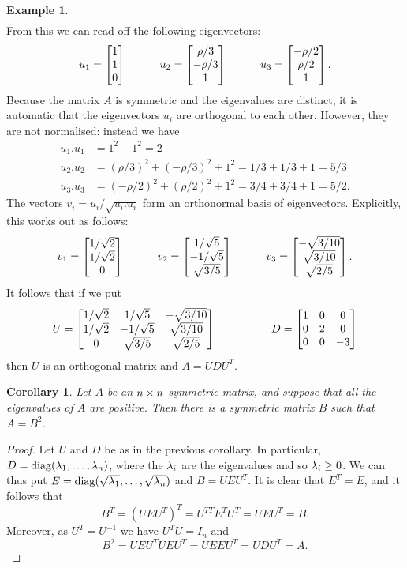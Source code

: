 \documentclass[reqno]{amsart}
\newtheorem{corollary}[theorem]{Corollary}
\theoremstyle{definition}
\newtheorem{example}[theorem]{Example}
\begin{document}
\begin{example}
\begin{align*}
 \end{align*}
 From this we can read off the following eigenvectors:
 \[
    u_1 = \left[\begin{matrix} 1\\1\\0\end{matrix}\right] \hspace{3em}
    u_2 = \left[\begin{matrix} \rho/3 \\ -\rho/3\\ 1\end{matrix}\right] \hspace{3em}
    u_3 = \left[\begin{matrix} -\rho/2\\ \rho/2 \\ 1 \end{matrix}\right]. 
 \]
 Because the matrix $A$ is symmetric and the eigenvalues are distinct,
 it is automatic that the eigenvectors $u_i$ are orthogonal to each
 other.  However, they are not normalised: instead we have
 \begin{align*}
    u_1.u_1 &= 1^2+1^2 = 2 \\
    u_2.u_2 &= (\rho/3)^2 + (-\rho/3)^2 + 1^2 
             = 1/3 + 1/3 + 1 = 5/3 \\
    u_3.u_3 &= (-\rho/2)^2 + (\rho/2)^2 + 1^2
             = 3/4 + 3/4 + 1 = 5/2.
 \end{align*}
 The vectors $v_i=u_i/\sqrt{u_i.u_i}$ form an orthonormal basis of
 eigenvectors.  Explicitly, this works out as follows:
 \[ 
   v_1 = \left[\begin{matrix} 1/\sqrt{2} \\ 1/\sqrt{2} \\ 0 \end{matrix}\right]
   \hspace{3em}
   v_2 = \left[\begin{matrix} 1/\sqrt{5} \\ -1/\sqrt{5} \\ \sqrt{3/5} \end{matrix}\right]
   \hspace{3em}
   v_3 = \left[\begin{matrix} -\sqrt{3/10} \\ \sqrt{3/10} \\ \sqrt{2/5} \end{matrix}\right].
 \]
 It follows that if we put 
 \[ 
  U = \left[\begin{matrix} 
       1/\sqrt{2} &  1/\sqrt{5} & -\sqrt{3/10} \\
       1/\sqrt{2} & -1/\sqrt{5} &  \sqrt{3/10} \\
       0          &  \sqrt{3/5} &  \sqrt{2/5} 
      \end{matrix}\right]
  \hspace{5em}
  D = \left[\begin{matrix} 
       1 & 0 & 0 \\ 0 & 2 & 0 \\ 0 & 0 & -3 
      \end{matrix}\right]
 \]
 then $U$ is an orthogonal matrix and $A=UDU^T$.
\end{example}

\begin{corollary}\label{cor-square-root}
 Let $A$ be an $n\times n$ symmetric matrix, and suppose that all the
 eigenvalues of $A$ are positive.  Then there is a symmetric matrix
 $B$ such that $A=B^2$.
\end{corollary}
\begin{proof}
 Let $U$ and $D$ be as in the previous corollary.  In particular,
 $D=\operatorname{diag}(\lambda_1,\dotsc,\lambda_n)$, where the $\lambda_i$ are the eigenvalues
 and so $\lambda_i\geq 0$.  We can thus put
 $E=\operatorname{diag}(\sqrt{\lambda_1},\dotsc,\sqrt{\lambda_n})$ and $B=UEU^T$.  It is
 clear that $E^T=E$, and it follows that 
 \[ B^T = (UEU^T)^T = U^{TT}E^TU^T = UEU^T = B. \]
 Moreover, as $U^T=U^{-1}$ we have $U^TU=I_n$ and 
 \[ B^2 = UEU^TUEU^T = UEEU^T = UDU^T = A. \]
\end{proof}
\end{document}
